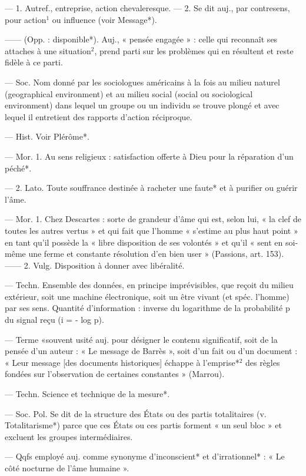 \begin{itemize}[leftmargin=1cm, label=, itemsep=1pt]
 — 1. Autref., entreprise,
action chevaleresque. — 2. Se dit
auj., par contresens, pour action$^1$
ou influence (voir Message*).

 —— (Opp. : disponible*).
Auj., « pensée engagée » : celle qui
reconnaît ses attaches à une situation$^2$, prend parti sur les problèmes
qui en résultent et reste fidèle
à ce parti.

 — Soc. Nom donné
par les sociologues américains à la
fois au milieu naturel (geographical
environment) et au milieu social
(social ou sociological environment)
dans lequel un groupe ou un individu se trouve plongé et avec lequel
il entretient des rapports d'action
réciproque.

 — Hist. Voir Plérôme*.

 — Mor. 1. Au sens religieux : satisfaction offerte à Dieu
pour la réparation d’un péché*.

— 2. Lato. Toute souffrance destinée
à racheter une faute* et à purifier
ou guérir l'âme.

 — Mor. 1. Chez Descartes : sorte de grandeur d’âme
qui est, selon lui, « la clef de toutes
les autres vertus » et qui fait que
l’homme « s’estime au plus haut
point » en tant qu'il possède la
« libre disposition de ses volontés »
et qu'il « sent en soi-même une
ferme et constante résolution d'en
bien user » (Passions, art. 153). ——
2. Vulg. Disposition à donner avec
libéralité.

 — Techn. Ensemble
des données, en principe imprévisibles, que reçoit du milieu extérieur, soit une machine électronique, soit un être vivant (et spéc.
l’homme) par ses sens. Quantité
d’information : inverse du logarithme de la probabilité p du
signal reçu (i = - log p).

 — Terme «souvent usité
auj. pour désigner le contenu significatif, soit de la pensée d’un auteur : « Le message de Barrès »,
soit d’un fait ou d’un document :
« Leur message [des documents
historiques] échappe à l’emprise*$^2$
des règles fondées sur l'observation
de certaines constantes » (Marrou).

 — Techn. Science et technique de la mesure*.

 — Soc. Pol. Se dit de
la structure des États ou des partis totalitaires (v. Totalitarisme*)
parce que ces États ou ces partis
forment « un seul bloc » et excluent les groupes intermédiaires.

 — Qqfs employé auj.
comme synonyme d’inconscient*
et d’irrationnel* : « Le côté nocturne de l’âme humaine ».


\end{itemize}
